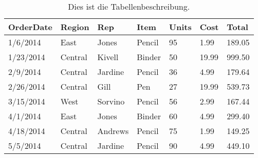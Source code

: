 \begin{table}[tb]
  \centering
  \caption{Dies ist die Tabellenbeschreibung.}
  \begin{tabular}{l l l l l l l}
    \toprule
    OrderDate & Region & Rep & Item & Units & Cost & Total \\
    \midrule
    1/6/2014 & East & Jones & Pencil & 95 & 1.99 & 189.05 \\
    1/23/2014 & Central & Kivell & Binder & 50 & 19.99 & 999.50 \\
    2/9/2014 & Central & Jardine & Pencil & 36 & 4.99 & 179.64 \\
    2/26/2014 & Central & Gill & Pen & 27 & 19.99 & 539.73 \\
    3/15/2014 & West & Sorvino & Pencil & 56 & 2.99 & 167.44 \\
    4/1/2014 & East & Jones & Binder & 60 & 4.99 & 299.40 \\
    4/18/2014 & Central & Andrews & Pencil & 75 & 1.99 & 149.25 \\
    5/5/2014 & Central & Jardine & Pencil & 90 & 4.99 & 449.10 \\
    \bottomrule
  \end{tabular}
  \label{tab:1}
\end{table}
%
\blindtext


